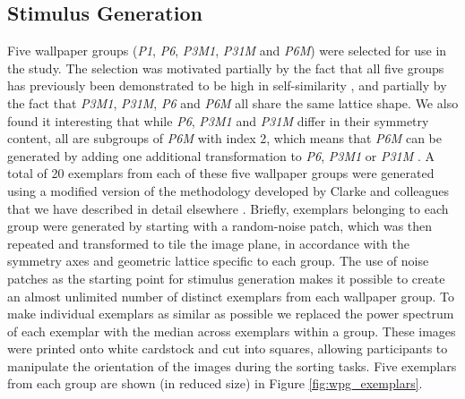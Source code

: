 \documentclass[symmetry,article,accept,pdftex,moreauthors]{Definitions/mdpi}
\begin{document}
\subsection{Stimulus Generation}
Five wallpaper groups (\textit{P1}, \textit{P6}, \textit{P3M1}, \textit{P31M} and \textit{P6M}) were selected for use in the study. The selection was motivated partially by the fact that all five groups has previously been demonstrated to be high in self-similarity \citep{RN172}, and partially by the fact that \textit{P3M1}, \textit{P31M}, \textit{P6} and \textit{P6M} all share the same lattice shape. We also found it interesting that while \textit{P6}, \textit{P3M1} and \textit{P31M} differ in their symmetry content, all are subgroups of \textit{P6M} with index 2, which means that \textit{P6M} can be generated by adding one additional transformation to \textit{P6}, \textit{P3M1} or \textit{P31M} \citep{kohler_clarke_2021}. A total of 20 exemplars from each of these five wallpaper groups were generated using a modified version of the methodology developed by Clarke and colleagues \citep{RN172} that we have described in detail elsewhere \citep{RN1725}. Briefly, exemplars belonging to each group were generated by starting with a random-noise patch, which was then repeated and transformed to tile the image plane, in accordance with the symmetry axes and geometric lattice specific to each group. The use of noise patches as the starting point for stimulus generation makes it possible to create an almost unlimited number of distinct exemplars from each wallpaper group. To make individual exemplars as similar as possible we replaced the power spectrum of each exemplar with the median across exemplars within a group. These images were printed onto white cardstock and cut into squares, allowing participants to manipulate the orientation of the images during the sorting tasks. Five exemplars from each group are shown (in reduced size) in Figure \ref{fig:wpg_exemplars}. 
\end{document}
